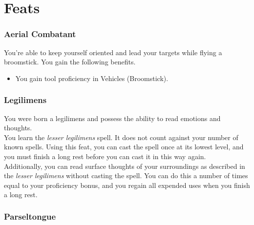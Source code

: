 \documentclass[a4paper,twocolumn,openany,nodeprecatedcode]{dndbook}
\begin{document}
\chapter{Feats}

    \subsection{Aerial Combatant}

        You're able to keep yourself oriented and lead your targets while flying a broomstick.
        You gain the following benefits.

        \begin{itemize}
            \item You gain tool proficiency in Vehicles (Broomstick).
        \end{itemize}


    \subsection{Legilimens}

        You were born a legilimens and possess the ability to read emotions and thoughts.\\

        You learn the \textit{lesser legilimens} spell.
        It does not count against your number of known spells.
        Using this feat, you can cast the spell once at its lowest level, and you must finish a long rest before you can cast it in this way again.\\

        Additionally, you can read surface thoughts of your surroundings as described in the \textit{lesser legilimens} without casting the spell.
        You can do this a number of times equal to your proficiency bonus, and you regain all expended uses when you finish a long rest.


    \subsection{Parseltongue}
\end{document}
